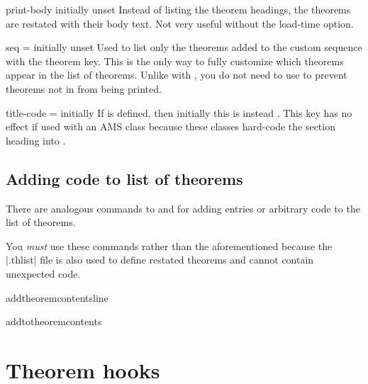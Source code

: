 \documentclass{ltxdoc}
\newcommand{\ttbraces}[1]{\braces{\texttt{#1}}}
\begin{document}
\begin{docKey}{print-body}
  {}
  {initially unset}
Instead of listing the theorem headings, the theorems are restated with their body text.
Not very useful without the  load-time option.
\end{docKey}

\begin{docKey}[][doc label=listof/seq]{seq}
  {=}
  {initially unset}
Used to list only the theorems added to the custom sequence  with the  theorem key.
This is the only way to fully customize which theorems appear in the list of theorems.
Unlike with , you do not need to use  to prevent theorems not in  from being printed.
\end{docKey}

\begin{docKey}{title-code}
  {=}
  {initially \ttbraces{\#1}}
If  is defined, then initially this is instead \ttbraces{\#1}. This key has no effect if used with an AMS class because these classes hard-code the section heading into .
\end{docKey}

\subsection{Adding code to list of theorems}

There are analogous commands to  and  for adding entries or arbitrary code to the list of theorems.

\begin{notebox}
You \emph{must} use these commands rather than the aforementioned because the |.thlist| file is also used to define restated theorems and cannot contain unexpected code.
\end{notebox}

\begin{docCommand}{addtheoremcontentsline}
  {}

\end{docCommand}

\begin{docCommand}{addtotheoremcontents}
  {}

\end{docCommand}

\section{Theorem hooks} \label{keythms-hooks}
\end{document}
